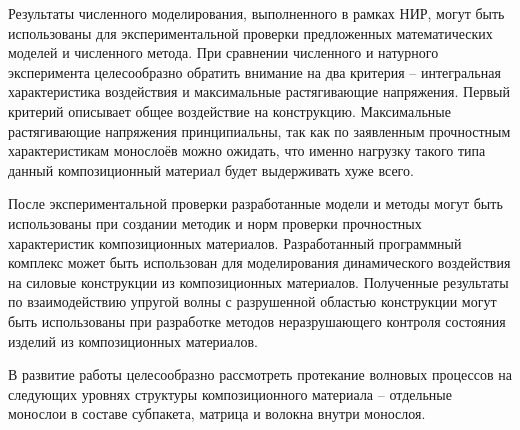 Результаты численного моделирования, выполненного в рамках НИР, могут быть использованы для экспериментальной проверки предложенных математических моделей и численного метода. При сравнении численного и натурного эксперимента целесообразно обратить внимание на два критерия -- интегральная характеристика воздействия и максимальные растягивающие напряжения. Первый критерий описывает общее воздействие на конструкцию. Максимальные растягивающие напряжения принципиальны, так как по заявленным прочностным характеристикам монослоёв можно ожидать, что именно нагрузку такого типа данный композиционный материал будет выдерживать хуже всего.

После экспериментальной проверки разработанные модели и методы могут быть использованы при создании методик и норм проверки прочностных характеристик композиционных материалов. Разработанный программный комплекс может быть использован для моделирования динамического воздействия на силовые конструкции из композиционных материалов. Полученные результаты по взаимодействию упругой волны с разрушенной областью конструкции могут быть использованы при разработке методов неразрушающего контроля состояния изделий из композиционных материалов.

В развитие работы целесообразно рассмотреть протекание волновых процессов на следующих уровнях структуры композиционного материала -- отдельные монослои в составе субпакета, матрица и волокна внутри монослоя.

